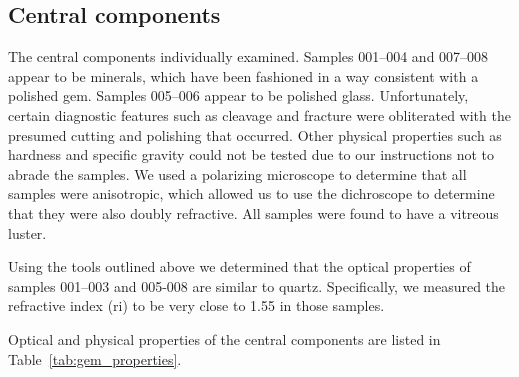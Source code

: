 \documentclass[10pt]{article}
\theoremstyle{definition}
\begin{document}
\subsection{Central components}
The central components individually examined.  Samples 001--004 and 007--008 appear to be minerals, which have been fashioned in a way consistent with a polished gem.  Samples 005--006 appear to be polished glass.  Unfortunately, certain diagnostic features such as cleavage and fracture were obliterated with the presumed cutting and polishing that occurred.  Other physical properties such as hardness and specific gravity could not be tested due to our instructions not to abrade the samples.  We used a polarizing microscope to determine that all samples were anisotropic, which allowed us to use the dichroscope to determine that they were also doubly refractive.  All samples were found to have a vitreous luster. 

Using the tools outlined above we determined that the optical properties of samples 001--003 and 005-008 are similar to quartz.  Specifically, we measured the refractive index (ri) to be very close to 1.55 in those samples.  

Optical and physical properties of the central components are listed in Table~\ref{tab:gem_properties}.
\end{document}
